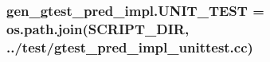 \subsubsection[{\texorpdfstring{U\+N\+I\+T\+\_\+\+T\+E\+ST}{UNIT_TEST}}]{\setlength{\rightskip}{0pt plus 5cm}gen\+\_\+gtest\+\_\+pred\+\_\+impl.\+U\+N\+I\+T\+\_\+\+T\+E\+ST = os.\+path.\+join({\bf S\+C\+R\+I\+P\+T\+\_\+\+D\+IR}, \textquotesingle{}../test/{\bf gtest\+\_\+pred\+\_\+impl\+\_\+unittest.\+cc}\textquotesingle{})}\hypertarget{namespacegen__gtest__pred__impl_a8c1cb8e87c4bd84edbb958f73b7df200}{}\label{namespacegen__gtest__pred__impl_a8c1cb8e87c4bd84edbb958f73b7df200}
